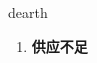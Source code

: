 
\begin{frame}
{\huge dearth}
\begin{center}
\begin{enumerate}\Large
  \item \textbf{供应不足}
\end{enumerate}
\end{center}
\end{frame}
